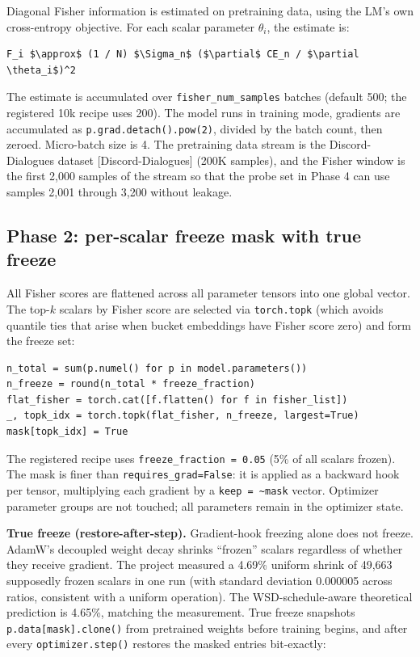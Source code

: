 \documentclass[11pt]{article}
\begin{document}
Diagonal Fisher information is estimated on pretraining data, using the LM's own cross-entropy objective. For each scalar parameter $\theta_i$, the estimate is:

\begin{lstlisting}
F_i $\approx$ (1 / N) $\Sigma_n$ ($\partial$ CE_n / $\partial \theta_i$)^2
\end{lstlisting}

The estimate is accumulated over \texttt{fisher\_num\_samples} batches (default 500; the registered 10k recipe uses 200). The model runs in training mode, gradients are accumulated as \texttt{p.grad.detach().pow(2)}, divided by the batch count, then zeroed. Micro-batch size is 4. The pretraining data stream is the Discord-Dialogues dataset [Discord-Dialogues] (200K samples), and the Fisher window is the first 2{,}000 samples of the stream so that the probe set in Phase 4 can use samples 2{,}001 through 3{,}200 without leakage.

\subsection{Phase 2: per-scalar freeze mask with true freeze}

All Fisher scores are flattened across all parameter tensors into one global vector. The top-$k$ scalars by Fisher score are selected via \texttt{torch.topk} (which avoids quantile ties that arise when bucket embeddings have Fisher score zero) and form the freeze set:

\begin{lstlisting}
n_total = sum(p.numel() for p in model.parameters())
n_freeze = round(n_total * freeze_fraction)
flat_fisher = torch.cat([f.flatten() for f in fisher_list])
_, topk_idx = torch.topk(flat_fisher, n_freeze, largest=True)
mask[topk_idx] = True
\end{lstlisting}

The registered recipe uses \texttt{freeze\_fraction = 0.05} (5\% of all scalars frozen). The mask is finer than \texttt{requires\_grad=False}: it is applied as a backward hook per tensor, multiplying each gradient by a \texttt{keep = \textasciitilde{}mask} vector. Optimizer parameter groups are not touched; all parameters remain in the optimizer state.

\textbf{True freeze (restore-after-step).} Gradient-hook freezing alone does not freeze. AdamW's decoupled weight decay shrinks ``frozen'' scalars regardless of whether they receive gradient. The project measured a 4.69\% uniform shrink of 49{,}663 supposedly frozen scalars in one run (with standard deviation 0.000005 across ratios, consistent with a uniform operation). The WSD-schedule-aware theoretical prediction is 4.65\%, matching the measurement. True freeze snapshots \texttt{p.data[mask].clone()} from pretrained weights before training begins, and after every \texttt{optimizer.step()} restores the masked entries bit-exactly:
\end{document}
